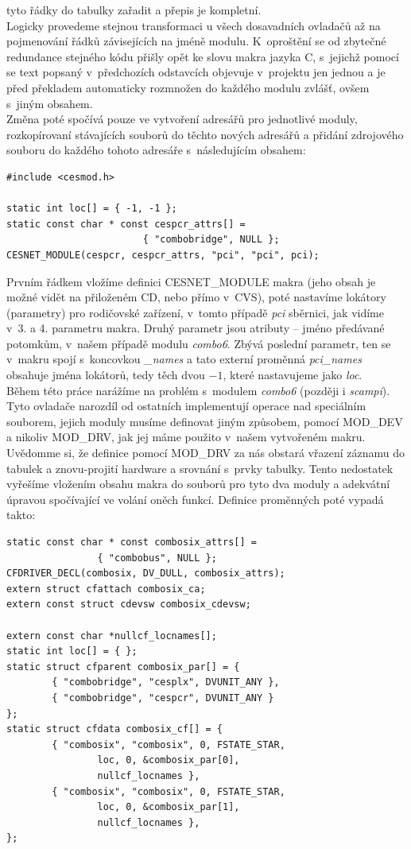   tyto řádky do tabulky zařadit a přepis je kompletní. \\ \indent
  Logicky provedeme stejnou transformaci u všech dosavadních ovla\-da\-čů až na
  pojmenování řádků závisejících na jméně modulu. K~oproštění se od zbytečné
  redundance stejného kódu přišly opět ke slovu makra jazyka C, s~jejichž
  pomocí se text popsaný v~předchozích odstavcích objevuje v~projektu jen
  jednou a je před překladem automaticky rozmnožen do každého modulu zvlášť,
  ovšem s~jiným obsahem. \\ \indent
  Změna poté spočívá pouze ve vytvoření adresářů pro jednotlivé moduly,
  rozkopírovaní stávajících souborů do těchto nových adresářů a přidání
  zdrojového souboru do každého tohoto adresáře s~následujícím obsahem:
\begin{verbatim}
#include <cesmod.h>

static int loc[] = { -1, -1 };
static const char * const cespcr_attrs[] =
                        { "combobridge", NULL };
CESNET_MODULE(cespcr, cespcr_attrs, "pci", "pci", pci);
\end{verbatim}
  Prvním řádkem vložíme definici CESNET\_MODULE makra (jeho obsah je možné
  vidět na přiloženém CD, nebo přímo v~CVS), poté nastavíme
  lokátory (parametry) pro rodičovské zařízení, v~tomto případě \emph{pci}
  sběrnici,
  jak vidíme v~3. a 4. parametru makra. Druhý parametr jsou atributy --
  jméno předávané potomkům, v~našem případě modulu \emph{combo6}.
  Zbývá poslední parametr, ten se v~makru spojí s~koncovkou \emph{\_names} a
  tato externí proměnná \emph{pci\_names} obsahuje jména lokátorů, tedy těch
  dvou $-1$, které nastavujeme jako \emph{loc}. \\ \indent
  Během této práce narážíme na problém s~modulem \emph{combo6} (později i
  \emph{scampi}). Tyto ovladače narozdíl od ostatních implementují operace nad
  speciálním souborem, jejich moduly musíme definovat jiným způsobem, pomocí
  MOD\_DEV a nikoliv MOD\_DRV,
  jak jej máme použito v~našem vytvořeném makru. Uvědomme si, že definice
  pomocí MOD\_DRV za nás obstará vřazení záznamu do tabulek a znovu-projití
  hardware a srovnání s~prvky tabulky. Tento nedostatek vyřešíme vložením
  obsahu makra do souborů pro tyto dva moduly a adekvátní úpravou spočívající
  ve volání oněch funkcí. Definice proměnných poté vypadá takto:
\begin{verbatim}
static const char * const combosix_attrs[] =
                { "combobus", NULL };
CFDRIVER_DECL(combosix, DV_DULL, combosix_attrs);
extern struct cfattach combosix_ca;
extern const struct cdevsw combosix_cdevsw;

extern const char *nullcf_locnames[];
static int loc[] = { };
static struct cfparent combosix_par[] = {
        { "combobridge", "cesplx", DVUNIT_ANY },
        { "combobridge", "cespcr", DVUNIT_ANY }
};
static struct cfdata combosix_cf[] = {
        { "combosix", "combosix", 0, FSTATE_STAR,
                loc, 0, &combosix_par[0],
                nullcf_locnames },
        { "combosix", "combosix", 0, FSTATE_STAR,
                loc, 0, &combosix_par[1],
                nullcf_locnames },
};
\end{verbatim}
